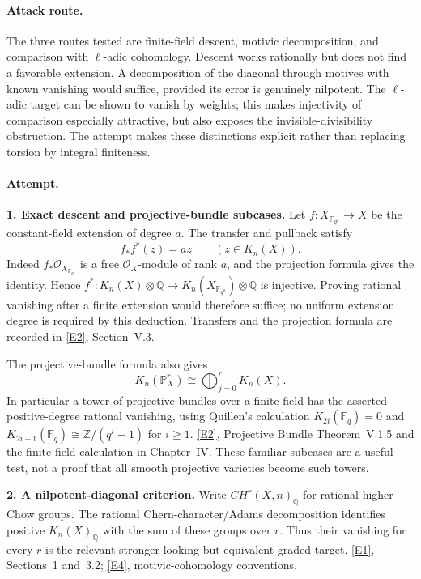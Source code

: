 \documentclass[11pt,a4paper]{article}
\newcommand{\Z}{\mathbb{Z}}
\newcommand{\Q}{\mathbb{Q}}
\newcommand{\F}{\mathbb{F}}
\newcommand{\PP}{\mathbb P}
\newcommand{\eref}[2]{\hyperlink{extra:#1:#2}{[E#2]}}
\numberwithin{equation}{section}
\begin{document}
\paragraph{Attack route.}
The three routes tested are finite-field descent, motivic decomposition,
and comparison with $\ell$-adic cohomology. Descent works rationally but
does not find a favorable extension. A decomposition of the diagonal
through motives with known vanishing would suffice, provided its error
is genuinely nilpotent. The $\ell$-adic target can be shown to vanish by
weights; this makes injectivity of comparison especially attractive,
but also exposes the invisible-divisibility obstruction. The attempt
makes these distinctions explicit rather than replacing torsion by
integral finiteness.

\paragraph{Attempt.}
\textbf{1. Exact descent and projective-bundle subcases.}
Let $f:X_{\F_{q^a}}\to X$ be the constant-field extension of degree $a$.
The transfer and pullback satisfy
\[
 f_*f^*(z)=a z\qquad(z\in K_n(X)).
\]
Indeed $f_*\mathcal O_{X_{\F_{q^a}}}$ is a free $\mathcal O_X$-module
of rank $a$, and the projection formula gives the identity. Hence
$f^*:K_n(X)\otimes\Q\to K_n(X_{\F_{q^a}})\otimes\Q$ is injective.
Proving rational vanishing after a finite extension would therefore
suffice; no uniform extension degree is required by this deduction.
Transfers and the projection formula are recorded in \eref{7200016}{2},
Section~V.3.

The projective-bundle formula also gives
\[
 K_n(\PP^r_X)\cong\bigoplus_{j=0}^r K_n(X).
\]
In particular a tower of projective bundles over a finite field has the
asserted positive-degree rational vanishing, using Quillen's calculation
$K_{2i}(\F_q)=0$ and
$K_{2i-1}(\F_q)\cong\Z/(q^i-1)$ for $i\ge1$.
\eref{7200016}{2}, Projective Bundle Theorem~V.1.5 and the finite-field
calculation in Chapter~IV. These familiar subcases are a useful test,
not a proof that all smooth projective varieties become such towers.

\textbf{2. A nilpotent-diagonal criterion.}
Write $CH^r(X,n)_{\Q}$ for rational higher Chow groups. The rational
Chern-character/Adams decomposition identifies positive $K_n(X)_{\Q}$
with the sum of these groups over $r$. Thus their vanishing for every
$r$ is the relevant stronger-looking but equivalent graded target.
\eref{7200016}{1}, Sections~1 and~3.2; \eref{7200016}{4}, motivic-cohomology
conventions.
\end{document}
